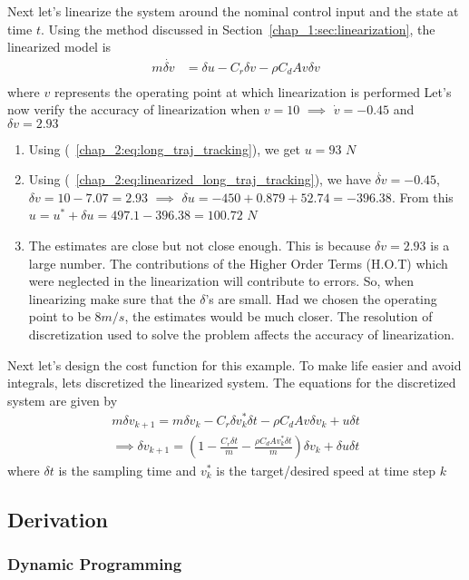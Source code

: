 Next let's linearize the system around the nominal control input and the state at time $t$.
Using the method discussed in Section~\ref{chap_1:sec:linearization}, the linearized model is
\begin{align}
    m\dot{\delta v} &= \delta u - C_r  \delta v - \rho C_d  A  v  \delta v \label{chap_2:eq:linearized_long_traj_tracking} \\
\end{align}
where $v$ represents the operating point at which linearization is performed
Let's now verify the accuracy of linearization when $v=10$ $\implies$ $\dot{v}=-0.45$ and $\delta v = 2.93$
\begin{enumerate}
    \item Using (~\ref{chap_2:eq:long_traj_tracking}), we get $u=93$ $N$ 
    \item Using (~\ref{chap_2:eq:linearized_long_traj_tracking}), we have $\dot{\delta v} = -0.45$, $\delta v = 10-7.07=2.93$ $\implies$ $\delta u = -450 + 0.879 + 52.74 = -396.38 $. From this $u = u^{*} + \delta u = 497.1 - 396.38 = 100.72$ $N$
    \item The estimates are close but not close enough. This is because $\delta v = 2.93$ is a large number. The contributions of the Higher Order Terms (H.O.T) which were neglected in the linearization will contribute to errors. So, when linearizing make sure that the $\delta$'s are small. Had we chosen the operating point to be $8 m/s$, the estimates would be much closer. The resolution of discretization used to solve the problem affects the accuracy of linearization.
\end{enumerate}
Next let's design the cost function for this example. To make life easier and avoid integrals, lets discretized the linearized system. The equations for the discretized system are given by
\begin{align}
    m\delta v_{k+1} = m\delta v_{k} - C_r \delta v^{*}_{k} \delta t - \rho C_d A v \delta v_{k} + u \delta t \\
    \implies
    \delta v_{k+1} = \left(1 - \frac{C_r \delta t}{m} - \frac{\rho C_d A v_{k}^{*} \delta t}{m}\right)\delta v_{k} + \delta u \delta t
\end{align}
where $\delta t$ is the sampling time and $v_{k}^{*}$ is the target/desired speed at time step $k$
\subsection{Derivation}
\subsubsection{Dynamic Programming}
